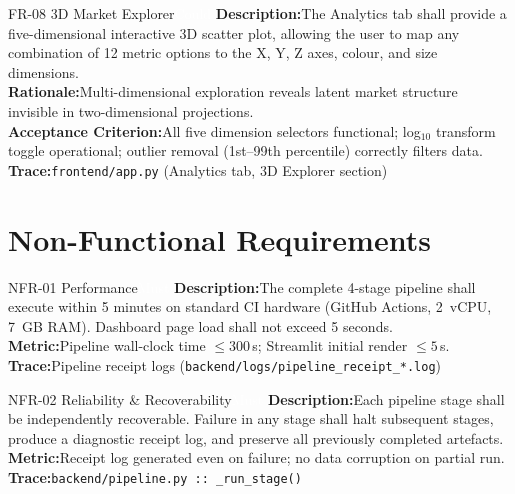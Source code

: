\documentclass[
  11pt,
  a4paper,
  twoside,
  openany
]{report}
\begin{document}
\vspace{6pt}

\begin{requirement}{FR-08 \;\textbar\; 3D Market Explorer\hfill\textcolor{white}{Could}}
\textbf{Description:}\;The Analytics tab shall provide a five-dimensional interactive 3D scatter plot, allowing the user to map any combination of 12 metric options to the X, Y, Z axes, colour, and size dimensions.\\[4pt]
\textbf{Rationale:}\;Multi-dimensional exploration reveals latent market structure invisible in two-dimensional projections.\\[4pt]
\textbf{Acceptance Criterion:}\;All five dimension selectors functional; log$_{10}$ transform toggle operational; outlier removal (1st–99th percentile) correctly filters data.\\[4pt]
\textbf{Trace:}\;\texttt{frontend/app.py} (Analytics tab, 3D Explorer section)
\end{requirement}

\section{Non-Functional Requirements}

\begin{requirement}{NFR-01 \;\textbar\; Performance\hfill\textcolor{white}{Must}}
\textbf{Description:}\;The complete 4-stage pipeline shall execute within 5 minutes on standard CI hardware (GitHub Actions, 2~vCPU, 7~GB RAM).  Dashboard page load shall not exceed 5 seconds.\\[4pt]
\textbf{Metric:}\;Pipeline wall-clock time $\leq 300$\,s; Streamlit initial render $\leq 5$\,s.\\[4pt]
\textbf{Trace:}\;Pipeline receipt logs (\texttt{backend/logs/pipeline\_receipt\_*.log})
\end{requirement}

\vspace{6pt}

\begin{requirement}{NFR-02 \;\textbar\; Reliability \& Recoverability\hfill\textcolor{white}{Must}}
\textbf{Description:}\;Each pipeline stage shall be independently recoverable.  Failure in any stage shall halt subsequent stages, produce a diagnostic receipt log, and preserve all previously completed artefacts.\\[4pt]
\textbf{Metric:}\;Receipt log generated even on failure; no data corruption on partial run.\\[4pt]
\textbf{Trace:}\;\texttt{backend/pipeline.py :: \_run\_stage()}
\end{requirement}
\end{document}
